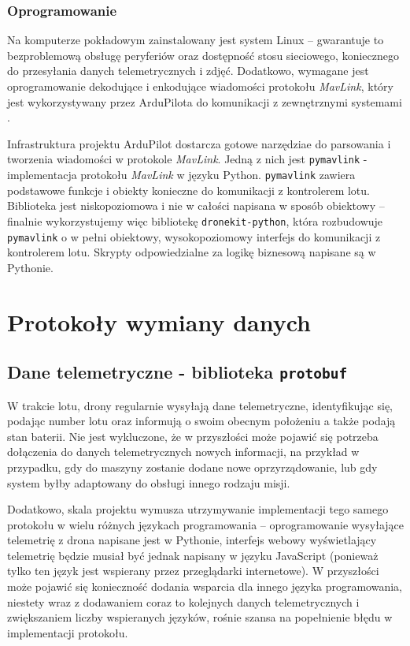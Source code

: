 \subsubsection{Oprogramowanie}

Na komputerze pokładowym zainstalowany jest system Linux -- gwarantuje to bezproblemową
obsługę peryferiów oraz dostępność stosu sieciowego, koniecznego do przesyłania 
danych telemetrycznych i zdjęć.
Dodatkowo, wymagane jest oprogramowanie dekodujące
i enkodujące wiadomości protokołu \textit{MavLink}, który jest wykorzystywany przez 
ArduPilota do komunikacji z zewnętrznymi systemami \cite{ardupilot_mavlink}.

Infrastruktura projektu ArduPilot dostarcza gotowe narzędziae do
parsowania i tworzenia wiadomości w protokole \textit{MavLink}.
Jedną z nich jest \texttt{pymavlink} - implementacja protokołu \textit{MavLink} 
w języku Python. \texttt{pymavlink} zawiera podstawowe funkcje i obiekty konieczne
do komunikacji z kontrolerem lotu. Biblioteka jest niskopoziomowa i nie w całości
napisana w sposób obiektowy -- finalnie wykorzystujemy więc bibliotekę
\texttt{dronekit-python}\cite{dronekit_python}, która rozbudowuje \texttt{pymavlink}
o w pełni obiektowy, wysokopoziomowy interfejs do komunikacji z kontrolerem lotu. 
Skrypty odpowiedzialne za logikę biznesową napisane są w Pythonie.

\section{Protokoły wymiany danych}

\subsection{Dane telemetryczne - biblioteka \texttt{protobuf}}

W trakcie lotu, drony regularnie wysyłają dane telemetryczne, identyfikując się,
podając number lotu oraz informują o swoim obecnym położeniu a także podają stan baterii.
Nie jest wykluczone, że w przyszłości może pojawić się potrzeba dołączenia do danych
telemetrycznych nowych informacji, na przykład w przypadku, gdy do maszyny zostanie
dodane nowe oprzyrządowanie, lub gdy system byłby adaptowany do obsługi innego rodzaju misji.

Dodatkowo, skala projektu wymusza utrzymywanie implementacji tego samego protokołu w wielu
różnych językach programowania -- oprogramowanie wysyłające telemetrię z drona napisane
jest w Pythonie, interfejs webowy wyświetlający telemetrię będzie musiał być jednak napisany
w języku JavaScript (ponieważ tylko ten język jest wspierany przez przeglądarki internetowe).
W przyszłości może pojawić się konieczność dodania wsparcia dla innego języka programowania,
niestety wraz z dodawaniem coraz to kolejnych danych telemetrycznych i zwiększaniem liczby
wspieranych języków, rośnie szansa na popełnienie błędu w implementacji protokołu.

